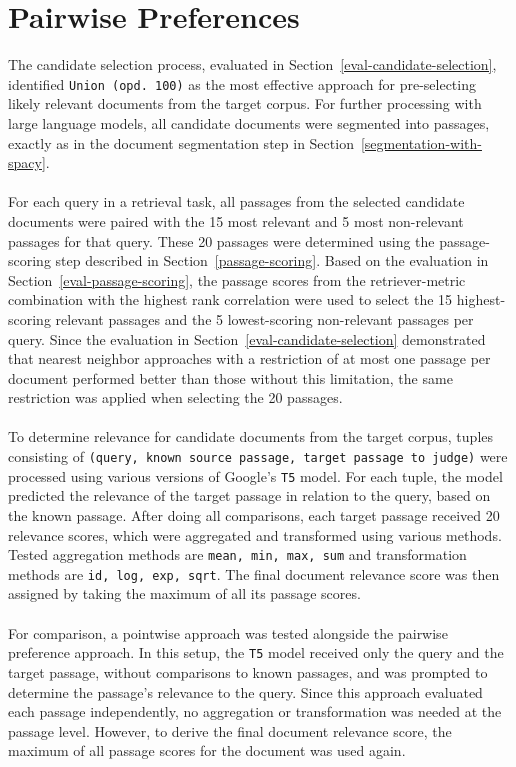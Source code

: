 \section{Pairwise Preferences}\label{eval-pairwise-preferences}

The candidate selection process, evaluated in Section~\ref{eval-candidate-selection}, identified \linebreak \mbox{\texttt{Union (opd.\ 100)}} as the most effective approach for pre-selecting likely relevant documents from the target corpus. For further processing with large language models, all candidate documents were segmented into passages, exactly as in the document segmentation step in Section~\ref{segmentation-with-spacy}.
\\\\
For each query in a retrieval task, all passages from the selected candidate documents were paired with the 15 most relevant and 5 most non-relevant passages for that query. These 20 passages were determined using the passage-scoring step described in Section~\ref{passage-scoring}. Based on the evaluation in Section~\ref{eval-passage-scoring}, the passage scores from the retriever-metric combination with the highest rank correlation were used to select the 15 highest-scoring relevant passages and the 5 lowest-scoring non-relevant passages per query. Since the evaluation in Section~\ref{eval-candidate-selection} demonstrated that nearest neighbor approaches with a restriction of at most one passage per document performed better than those without this limitation, the same restriction was applied when selecting the 20 passages.
\\\\
To determine relevance for candidate documents from the target corpus, tuples consisting of \texttt{(query, known source passage, target passage to judge)} were processed using various versions of Google's \texttt{T5} model. For each tuple, the model predicted the relevance of the target passage in relation to the query, based on the known passage. After doing all comparisons, each target passage received 20 relevance scores, which were aggregated and transformed using various methods. Tested aggregation methods are \texttt{mean, min, max, sum} and transformation methods are \texttt{id, log, exp, sqrt}. The final document relevance score was then assigned by taking the maximum of all its passage scores.
\\\\
For comparison, a pointwise approach was tested alongside the pairwise preference approach. In this setup, the \texttt{T5} model received only the query and the target passage, without comparisons to known passages, and was prompted to determine the passage's relevance to the query. Since this approach evaluated each passage independently, no aggregation or transformation was needed at the passage level. However, to derive the final document relevance score, the maximum of all passage scores for the document was used again.

